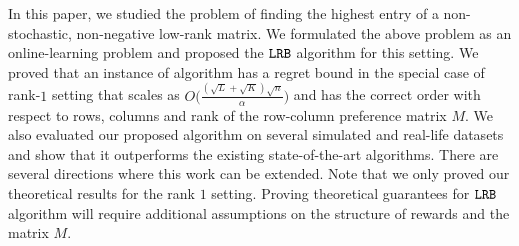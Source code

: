 In this paper, we studied the problem of finding the highest entry of a non-stochastic, non-negative low-rank matrix. We formulated the above problem as an online-learning problem and proposed the ${\tt LRB}$ algorithm for this setting. We proved that an instance of algorithm has a regret bound in the special case of rank-$1$ setting that scales as $O\big(\frac{(\sqrt{L } + \sqrt{K }) \sqrt{n}}{\alpha}\big)$ and has the correct order with respect to rows, columns and rank of the row-column preference matrix $M$. We also evaluated our proposed algorithm on several simulated and real-life datasets and show that it outperforms the existing state-of-the-art algorithms. There are several directions where this work can be extended. Note that we only proved our theoretical results for the rank $1$ setting. Proving theoretical guarantees for ${\tt LRB}$ algorithm will require additional assumptions on the structure of rewards and the matrix $M$. 


